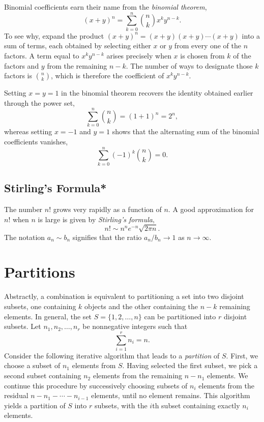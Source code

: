 Binomial coefficients earn their name from the \emph{binomial theorem}, 
\begin{equation*}
(x + y)^n = \sum_{k=0}^n \binom{n}{k} x^k y^{n-k} .
\end{equation*}
To see why, expand the product $(x+y)^n = (x+y)(x+y) \cdots (x+y)$ into a sum of terms, each obtained by selecting either $x$ or $y$ from every one of the $n$ factors.
A term equal to $x^k y^{n-k}$ arises precisely when $x$ is chosen from $k$ of the factors and $y$ from the remaining $n-k$.
The number of ways to designate those $k$ factors is $\binom{n}{k}$, which is therefore the coefficient of $x^k y^{n-k}$.

Setting $x = y = 1$ in the binomial theorem recovers the identity obtained earlier through the power set,
\begin{equation*}
\sum_{k=0}^n \binom{n}{k} = (1 + 1)^n = 2^n ,
\end{equation*}
whereas setting $x = -1$ and $y = 1$ shows that the alternating sum of the binomial coefficients vanishes,
\begin{equation*}
\sum_{k=0}^n (-1)^k \binom{n}{k} = 0 .
\end{equation*}


\subsection{Stirling's Formula*}

The number $n!$ grows very rapidly as a function of $n$.
A good approximation for $n!$ when $n$ is large is given by \emph{Stirling's formula}, 
\begin{equation*}
n! \sim n^n e^{-n} \sqrt{ 2 \pi n} .
\end{equation*}
The notation $a_n \sim b_n$ signifies that the ratio $a_n / b_n \rightarrow 1$ as $n \rightarrow \infty$.


\section{Partitions}

Abstractly, a combination is equivalent to partitioning a set into two disjoint subsets, one containing $k$ objects and the other containing the $n-k$ remaining elements.
In general, the set $S = \{ 1, 2, \ldots, n \}$ can be partitioned into $r$ disjoint subsets.
Let $n_1, n_2, \ldots, n_r$ be nonnegative integers such that
\begin{equation*}
\sum_{i = 1}^r n_i = n.
\end{equation*}
Consider the following iterative algorithm that leads to a \emph{partition} of $S$. 
First, we choose a subset of $n_1$ elements from $S$.
Having selected the first subset, we pick a second subset containing $n_2$ elements from the remaining $n - n_1$ elements.
We continue this procedure by successively choosing subsets of $n_i$ elements from the residual $n - n_1 - \cdots - n_{i-1}$ elements, until no element remains.
This algorithm yields a partition of $S$ into $r$ subsets, with the $i$th subset containing exactly $n_i$ elements.

